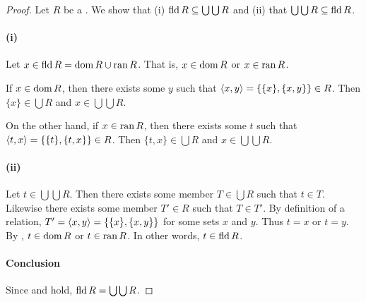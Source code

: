 \documentclass{report}
\begin{document}
  \begin{proof}
    Let $R$ be a .
    We show that (i) $\mathop{\text{fld}}{R} \subseteq \bigcup\bigcup R$ and (ii) that
      $\bigcup\bigcup R \subseteq \mathop{\text{fld}}{R}$.

    \paragraph{(i)}%

      Let $x \in \mathop{\text{fld}}{R} = \mathop{\text{dom}}{R} \cup \mathop{\text{ran}}{R}$.
      That is, $x \in \mathop{\text{dom}}{R}$ or $x \in \mathop{\text{ran}}{R}$.

      If $x \in \mathop{\text{dom}}{R}$, then there exists some $y$ such that
        $\left< x, y \right> = \{\{x\}, \{x, y\}\} \in R$.
      Then $\{x\} \in \bigcup R$ and $x \in \bigcup\bigcup R$.

      On the other hand, if $x \in \mathop{\text{ran}}{R}$, then there exists some $t$ such that
        $\left< t, x \right> = \{\{t\}, \{t, x\}\} \in R$.
      Then $\{t, x\} \in \bigcup R$ and $x \in \bigcup\bigcup R$.

    \paragraph{(ii)}%

      Let $t \in \bigcup\bigcup R$.
      Then there exists some member $T \in \bigcup R$ such that $t \in T$.
      Likewise there exists some member $T' \in R$ such that $T \in T'$.
      By definition of a relation, $T' = \left< x, y \right> = \{\{x\}, \{x, y\}\}$ for
        some sets $x$ and $y$.
      Thus $t = x$ or $t = y$.
      By , $t \in \mathop{\text{dom}}{R}$ or $t \in \mathop{\text{ran}}{R}$.
      In other words, $t \in \mathop{\text{fld}}{R}$.

    \paragraph{Conclusion}%

      Since  and  hold,
        $\mathop{\text{fld}}{R} = \bigcup\bigcup{R}$.

  \end{proof}

\subsection{}%
\end{document}
